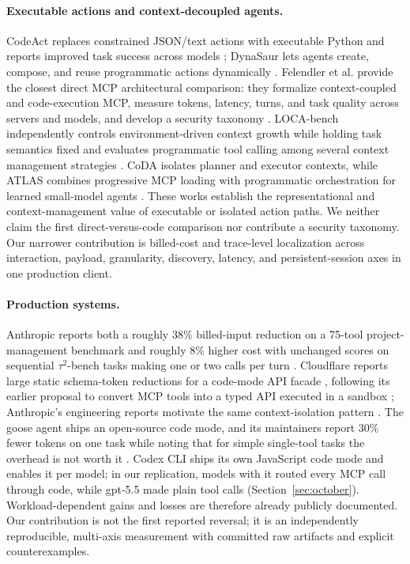 \documentclass[10pt,twocolumn]{article}
\begin{document}
\paragraph{Executable actions and context-decoupled agents.}
CodeAct replaces constrained JSON/text actions with executable Python and
reports improved task success across models \cite{wang2024codeact}; DynaSaur
lets agents create, compose, and reuse programmatic actions dynamically
\cite{nguyen2025dynasaur}.  Felendler et al. provide the closest direct MCP
architectural comparison: they formalize context-coupled and code-execution
MCP, measure tokens, latency, turns, and task quality across servers and
models, and develop a security taxonomy \cite{felendler2026mcp}.  LOCA-bench
independently controls environment-driven context growth while holding task
semantics fixed and evaluates programmatic tool calling among several context
management strategies \cite{zeng2026loca}.  CoDA isolates planner and executor
contexts, while ATLAS combines progressive MCP loading with programmatic
orchestration for learned small-model agents
\cite{liu2026coda,gupta2026atlas}.  These works establish the representational
and context-management value of executable or isolated action paths.  We
neither claim the first direct-versus-code comparison nor contribute a
security taxonomy.  Our narrower contribution is billed-cost and trace-level
localization across interaction, payload, granularity, discovery, latency,
and persistent-session axes in one production client.

\paragraph{Production systems.}
Anthropic reports both a roughly 38\% billed-input reduction on a 75-tool
project-management benchmark and roughly 8\% higher cost with unchanged scores
on sequential $\tau^2$-bench tasks making one or two calls per turn
\cite{anthropic2026ptc}.  Cloudflare reports large static schema-token
reductions for a code-mode API facade
\cite{cloudflare2026codemode}, following its earlier proposal to convert MCP
tools into a typed API executed in a sandbox \cite{cloudflare2025codemode};
Anthropic's engineering reports motivate the same context-isolation pattern
\cite{anthropic2025codemcp,anthropic2025advancedtools}.  The goose agent
ships an open-source code mode, and its maintainers report 30\% fewer tokens
on one task while noting that for simple single-tool tasks the overhead is
not worth it \cite{goose2026codemode}.  Codex CLI ships its
own JavaScript code mode and enables it per model; in our replication, models
with it routed every MCP call through code, while gpt-5.5 made plain tool
calls (Section~\ref{sec:october}).  Workload-dependent
gains and losses are therefore already publicly documented.  Our contribution
is not the first reported reversal; it is an independently reproducible,
multi-axis measurement with committed raw artifacts and explicit
counterexamples.
\end{document}
